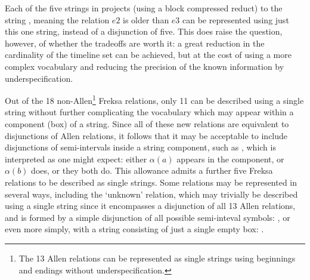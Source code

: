 \documentclass[a4paper,12pt,leqno,twoside]{article}
\newcommand{\vph}[1]{\vphantom{#1}}
\newcommand{\ebox}[1]{\fbox{$\vph{'(),}#1$}}
\newcommand{\EventString}[1]{%
	\renewcommand*{\do}[1]{\ebox{##1}}%
	\PipeParser{#1}%
}
\begin{document}
Each of the five strings in  projects (using a block compressed reduct) to the string \EventString{\alpha(e2),\alpha(e3)|\alpha(e3)|{}}, meaning the relation $e2$ is older than $e3$ can be represented using just this one string, instead of a disjunction of five. This does raise the question, however, of whether the tradeoffs are worth it: a great reduction in the cardinality of the timeline set can be achieved, but at the cost of using a more complex vocabulary and reducing the precision of the known information by underspecification.

Out of the 18 non-Allen\footnote{The 13 Allen relations can be represented as single strings using beginnings and endings without underspecification.} Freksa relations, only 11 can be described using a single string without further complicating the vocabulary which may appear within a component (box) of a string. Since all of these new relations are equivalent to disjunctions of Allen relations, it follows that it may be acceptable to include disjunctions of semi-intervals inside a string component, such as \ebox{\alpha(a) \lor \alpha(b)}, which is interpreted as one might expect: either $\alpha(a)$ appears in the component, or $\alpha(b)$ does, or they both do. This allowance admits a further five Freksa relations to be described as single strings. Some relations may be represented in several ways, including the `unknown' relation, which may trivially be described using a single string since it encompasses a disjunction of all 13 Allen relations, and is formed by a simple disjunction of all possible semi-inteval symbols: \ebox{\alpha(a) \lor \alpha(b) \lor \omega(a) \lor \omega(b) \lor \epsilon}, or even more simply, with a string consisting of just a single empty box: \ebox{}.
\end{document}
